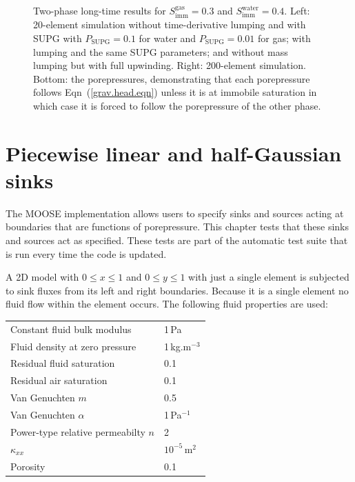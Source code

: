 \documentclass[]{scrreprt}
\begin{document}
\begin{figure}[htb]
\caption{Two-phase long-time results for
  $S^{\mathrm{gas}}_{\mathrm{imm}}=0.3$ and
  $S^{\mathrm{water}}_{\mathrm{imm}}=0.4$.  Left: 20-element
  simulation without time-derivative lumping and with SUPG with
  $P_{\mathrm{SUPG}}=0.1$ for water and $P_{\mathrm{SUPG}}=0.01$ for
  gas; with lumping and the same SUPG parameters; and without mass
  lumping but with full upwinding.  Right: 200-element simulation.
  Bottom: the porepressures, demonstrating that each porepressure
  follows Eqn~(\ref{grav.head.eqn}) unless it is at immobile
  saturation in which case it is forced to follow the porepressure of
  the other phase.}
\label{gh2.fig}
\end{figure}


\chapter{Piecewise linear and half-Gaussian sinks}
\label{si}

The MOOSE implementation allows users to specify sinks and sources
acting at boundaries that are functions of porepressure.  This chapter
tests that these sinks and sources act as specified.  These tests are
part of the automatic test suite that is run every time the code is
updated.

A 2D model with $0\leq x \leq 1$ and $0\leq y \leq 1$ with just a
single element is subjected to sink fluxes from its left and right
boundaries.  Because it is a single element no fluid flow within the
element occurs.  The following fluid properties are used:
\begin{center}
\begin{tabular}{|ll|}
\hline
Constant fluid bulk modulus & 1\,Pa \\
Fluid density at zero pressure & 1\,kg.m$^{-3}$ \\
Residual fluid saturation & 0.1 \\
Residual air saturation & 0.1 \\
Van Genuchten $m$ & 0.5 \\
Van Genuchten $\alpha$ & 1\,Pa$^{-1}$ \\
Power-type relative permeabilty $n$ & 2 \\
$\kappa_{xx}$ & $10^{-5}$\,m$^{2}$ \\
Porosity & 0.1 \\
\hline
\end{tabular} 
\end{center}
\end{document}

